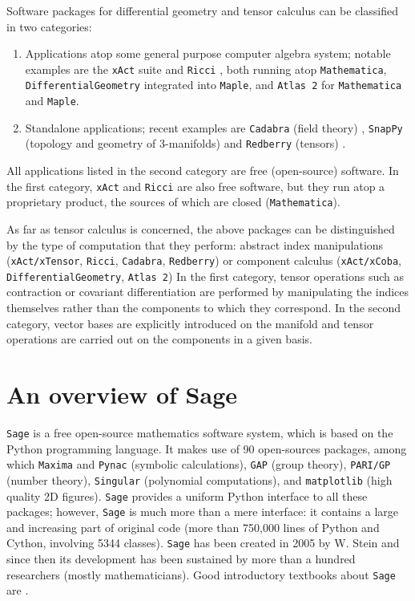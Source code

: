 \documentclass[a4paper]{jpconf}
\newcommand{\soft}[1]{\texttt{#1}}
\newcommand{\Sage}{\soft{Sage}}
\begin{document}
Software packages for differential geometry and tensor calculus can be 
classified in two categories: 
\begin{enumerate}
\item Applications atop some general purpose computer algebra system; 
notable examples are 
the \soft{xAct} suite \cite{Marti08,xAct} and \soft{Ricci} \cite{Ricci}, both
running atop \soft{Mathematica},
\soft{DifferentialGeometry} \cite{AnderT12,DiffGeom} integrated into \soft{Maple}, and \soft{Atlas 2}
\cite{Atlas2} for \soft{Mathematica} and \soft{Maple}.
\item Standalone applications; recent examples are \soft{Cadabra}  (field theory) \cite{Peete07,Cadabra},
\soft{SnapPy} (topology and geometry of 3-manifolds) \cite{SnapPy} and
\soft{Redberry} (tensors) \cite{BolotP13,Redberry}.
\end{enumerate}
All applications listed in the second category are free (open-source) software. In
the first category, \soft{xAct} and \soft{Ricci} are also free software, but
they run atop a proprietary product, the sources of which are closed (\soft{Mathematica}). 

As far as tensor calculus is concerned, the above packages can be distinguished by 
the type of computation that they perform: abstract index manipulations 
(\soft{xAct/xTensor}, \soft{Ricci}, \soft{Cadabra}, \soft{Redberry})
or component calculus (\soft{xAct/xCoba}, \soft{DifferentialGeometry}, \soft{Atlas 2})
In the first category, tensor operations such as contraction or covariant differentiation 
are performed by manipulating the indices themselves rather than the components 
to which they correspond. In the second category, vector bases are explicitly 
introduced on the manifold and tensor operations are carried out on the components 
in a given basis.



\section{An overview of Sage}

\Sage{} \cite{sage} is a free open-source mathematics software system, which is
based on the Python programming language. It makes use of 90 open-sources packages, 
among which \soft{Maxima} and \soft{Pynac} (symbolic calculations),
\soft{GAP} (group theory), 
\soft{PARI/GP} (number theory), \soft{Singular} (polynomial computations), 
and \soft{matplotlib} (high quality 2D figures). 
\Sage{} provides a uniform Python interface to all these packages; however, 
\Sage{} is much more than a mere interface: it contains a large and increasing part of 
original code (more than 750,000 lines of Python and Cython, involving 5344 classes). 
\Sage{} has been created in 2005 by W. Stein \cite{SteinJ05} and since
then its development has been sustained by more than a hundred researchers
(mostly mathematicians). Good introductory textbooks about \Sage{} are
\cite{JoyneS14,Zimme13,Bard15}. 
 
\end{document}
